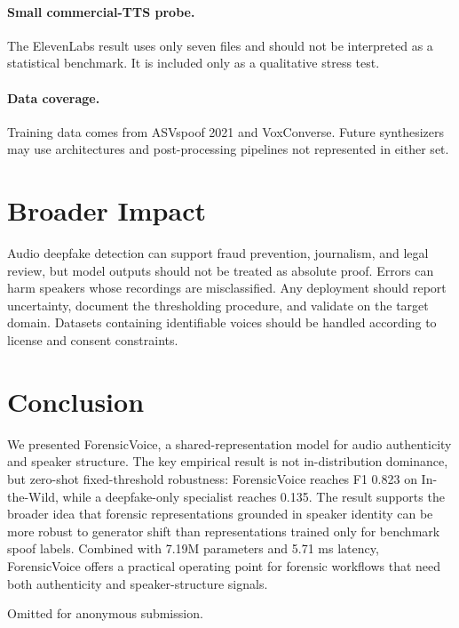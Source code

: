 \documentclass{article}
\newcommand{\fv}{ForensicVoice}
\newcommand{\asv}{ASVspoof}
\newcommand{\itw}{In-the-Wild}
\begin{document}
\paragraph{Small commercial-TTS probe.}
The ElevenLabs result uses only seven files and should not be interpreted as a
statistical benchmark.  It is included only as a qualitative stress test.

\paragraph{Data coverage.}
Training data comes from \asv{} 2021 and VoxConverse.  Future synthesizers may
use architectures and post-processing pipelines not represented in either set.

\section{Broader Impact}

Audio deepfake detection can support fraud prevention, journalism, and legal
review, but model outputs should not be treated as absolute proof.  Errors can
harm speakers whose recordings are misclassified.  Any deployment should report
uncertainty, document the thresholding procedure, and validate on the target
domain.  Datasets containing identifiable voices should be handled according to
license and consent constraints.

\section{Conclusion}

We presented \fv{}, a shared-representation model for audio authenticity and
speaker structure.  The key empirical result is not in-distribution dominance,
but zero-shot fixed-threshold robustness: \fv{} reaches F1 0.823 on \itw{},
while a deepfake-only specialist reaches 0.135.  The result supports the
broader idea that forensic representations grounded in speaker identity can be
more robust to generator shift than representations trained only for benchmark
spoof labels.  Combined with 7.19M parameters and 5.71 ms latency, \fv{} offers
a practical operating point for forensic workflows that need both authenticity
and speaker-structure signals.

\begin{ack}
Omitted for anonymous submission.
\end{ack}
\end{document}

